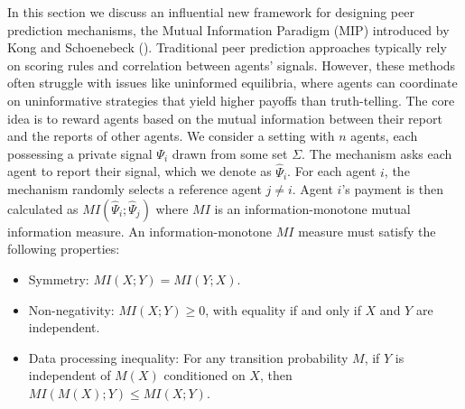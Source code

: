 \documentclass[
  letterpaper,
  numbers=noenddot,
  DIV=11]{scrreprt}
\theoremstyle{plain}
\theoremstyle{definition}
\theoremstyle{remark}
\begin{document}
In this section we discuss an influential new framework for designing
peer prediction mechanisms, the Mutual Information Paradigm (MIP)
introduced by Kong and Schoenebeck
().
Traditional peer prediction approaches typically rely on scoring rules
and correlation between agents' signals. However, these methods often
struggle with issues like uninformed equilibria, where agents can
coordinate on uninformative strategies that yield higher payoffs than
truth-telling. The core idea is to reward agents based on the mutual
information between their report and the reports of other agents. We
consider a setting with \(n\) agents, each possessing a private signal
\(\Psi_i\) drawn from some set \(\Sigma\). The mechanism asks each agent
to report their signal, which we denote as \(\hat{\Psi}_i\). For each
agent \(i\), the mechanism randomly selects a reference agent
\(j \neq i\). Agent \(i\)'s payment is then calculated as
\(MI(\hat{\Psi}_i; \hat{\Psi}_j)\) where \(MI\) is an
information-monotone mutual information measure. An information-monotone
\(MI\) measure must satisfy the following properties:

\begin{itemize}
\item
  Symmetry: \(MI(X; Y) = MI(Y; X)\).
\item
  Non-negativity: \(MI(X; Y) \geq 0\), with equality if and only if
  \(X\) and \(Y\) are independent.
\item
  Data processing inequality: For any transition probability \(M\), if
  \(Y\) is independent of \(M(X)\) conditioned on \(X\), then
  \(MI(M(X); Y) \leq MI(X; Y)\).
\end{itemize}
\end{document}

